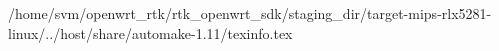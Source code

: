 /home/svm/openwrt_rtk/rtk_openwrt_sdk/staging_dir/target-mips-rlx5281-linux/../host/share/automake-1.11/texinfo.tex